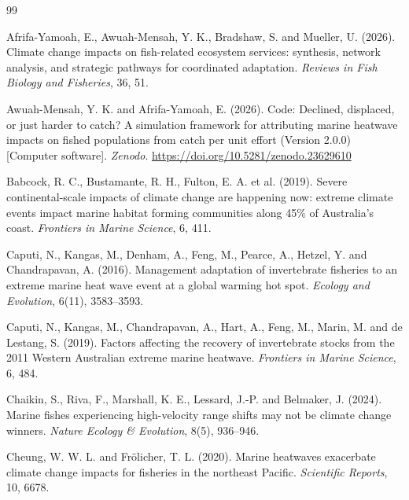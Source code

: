 \documentclass[11pt,a4paper]{article}
\begin{document}
\begin{thebibliography}{99}
\setlength{\itemsep}{2pt}

Afrifa-Yamoah, E., Awuah-Mensah, Y. K., Bradshaw, S. and Mueller, U. (2026). Climate change impacts on fish-related ecosystem services: synthesis, network analysis, and strategic pathways for coordinated adaptation. \textit{Reviews in Fish Biology and Fisheries}, 36, 51.

Awuah-Mensah, Y. K. and Afrifa-Yamoah, E. (2026). Code: Declined, displaced, or just harder to catch? A simulation framework for attributing marine heatwave impacts on fished populations from catch per unit effort (Version 2.0.0) [Computer software]. \textit{Zenodo}. \url{https://doi.org/10.5281/zenodo.23629610}

Babcock, R. C., Bustamante, R. H., Fulton, E. A. et al. (2019). Severe continental-scale impacts of climate change are happening now: extreme climate events impact marine habitat forming communities along 45\% of Australia's coast. \textit{Frontiers in Marine Science}, 6, 411.

Caputi, N., Kangas, M., Denham, A., Feng, M., Pearce, A., Hetzel, Y. and Chandrapavan, A. (2016). Management adaptation of invertebrate fisheries to an extreme marine heat wave event at a global warming hot spot. \textit{Ecology and Evolution}, 6(11), 3583--3593.

Caputi, N., Kangas, M., Chandrapavan, A., Hart, A., Feng, M., Marin, M. and de Lestang, S. (2019). Factors affecting the recovery of invertebrate stocks from the 2011 Western Australian extreme marine heatwave. \textit{Frontiers in Marine Science}, 6, 484.

Chaikin, S., Riva, F., Marshall, K. E., Lessard, J.-P. and Belmaker, J. (2024). Marine fishes experiencing high-velocity range shifts may not be climate change winners. \textit{Nature Ecology \& Evolution}, 8(5), 936--946.

Cheung, W. W. L. and Fr\"olicher, T. L. (2020). Marine heatwaves exacerbate climate change impacts for fisheries in the northeast Pacific. \textit{Scientific Reports}, 10, 6678.


\end{thebibliography}
\end{document}
